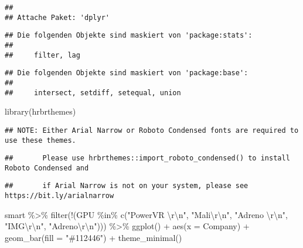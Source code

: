 \documentclass[
]{article}
\newenvironment{Shaded}{\begin{snugshade}}{\end{snugshade}}
\newcommand{\AttributeTok}[1]{\textcolor[rgb]{0.77,0.63,0.00}{#1}}
\newcommand{\FunctionTok}[1]{\textcolor[rgb]{0.00,0.00,0.00}{#1}}
\newcommand{\NormalTok}[1]{#1}
\newcommand{\SpecialCharTok}[1]{\textcolor[rgb]{0.00,0.00,0.00}{#1}}
\newcommand{\StringTok}[1]{\textcolor[rgb]{0.31,0.60,0.02}{#1}}
\begin{document}
\begin{verbatim}
## 
## Attache Paket: 'dplyr'
\end{verbatim}

\begin{verbatim}
## Die folgenden Objekte sind maskiert von 'package:stats':
## 
##     filter, lag
\end{verbatim}

\begin{verbatim}
## Die folgenden Objekte sind maskiert von 'package:base':
## 
##     intersect, setdiff, setequal, union
\end{verbatim}

\begin{Shaded}
\begin{Highlighting}[]
\FunctionTok{library}\NormalTok{(hrbrthemes)}
\end{Highlighting}
\end{Shaded}

\begin{verbatim}
## NOTE: Either Arial Narrow or Roboto Condensed fonts are required to use these themes.
\end{verbatim}

\begin{verbatim}
##       Please use hrbrthemes::import_roboto_condensed() to install Roboto Condensed and
\end{verbatim}

\begin{verbatim}
##       if Arial Narrow is not on your system, please see https://bit.ly/arialnarrow
\end{verbatim}

\begin{Shaded}
\begin{Highlighting}[]
\NormalTok{smart }\SpecialCharTok{\%\textgreater{}\%}
 \FunctionTok{filter}\NormalTok{(}\SpecialCharTok{!}\NormalTok{(GPU }\SpecialCharTok{\%in\%} \FunctionTok{c}\NormalTok{(}\StringTok{"PowerVR }\SpecialCharTok{\textbackslash{}r\textbackslash{}n}\StringTok{"}\NormalTok{, }\StringTok{"Mali}\SpecialCharTok{\textbackslash{}r\textbackslash{}n}\StringTok{"}\NormalTok{, }\StringTok{"Adreno }\SpecialCharTok{\textbackslash{}r\textbackslash{}n}\StringTok{"}\NormalTok{, }\StringTok{"IMG}\SpecialCharTok{\textbackslash{}r\textbackslash{}n}\StringTok{"}\NormalTok{, }\StringTok{"Adreno}\SpecialCharTok{\textbackslash{}r\textbackslash{}n}\StringTok{"}\NormalTok{))) }\SpecialCharTok{\%\textgreater{}\%}
 \FunctionTok{ggplot}\NormalTok{() }\SpecialCharTok{+}
  \FunctionTok{aes}\NormalTok{(}\AttributeTok{x =}\NormalTok{ Company) }\SpecialCharTok{+}
  \FunctionTok{geom\_bar}\NormalTok{(}\AttributeTok{fill =} \StringTok{"\#112446"}\NormalTok{) }\SpecialCharTok{+}
  \FunctionTok{theme\_minimal}\NormalTok{()}
\end{Highlighting}
\end{Shaded}
\end{document}

